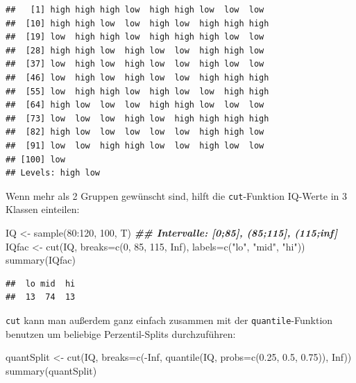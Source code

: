 \documentclass[
]{book}
\newenvironment{Shaded}{\begin{snugshade}}{\end{snugshade}}
\newcommand{\AttributeTok}[1]{\textcolor[rgb]{0.77,0.63,0.00}{#1}}
\newcommand{\ConstantTok}[1]{\textcolor[rgb]{0.00,0.00,0.00}{#1}}
\newcommand{\DecValTok}[1]{\textcolor[rgb]{0.00,0.00,0.81}{#1}}
\newcommand{\DocumentationTok}[1]{\textcolor[rgb]{0.56,0.35,0.01}{\textbf{\textit{#1}}}}
\newcommand{\FloatTok}[1]{\textcolor[rgb]{0.00,0.00,0.81}{#1}}
\newcommand{\FunctionTok}[1]{\textcolor[rgb]{0.00,0.00,0.00}{#1}}
\newcommand{\NormalTok}[1]{#1}
\newcommand{\OtherTok}[1]{\textcolor[rgb]{0.56,0.35,0.01}{#1}}
\newcommand{\SpecialCharTok}[1]{\textcolor[rgb]{0.00,0.00,0.00}{#1}}
\newcommand{\StringTok}[1]{\textcolor[rgb]{0.31,0.60,0.02}{#1}}
\begin{document}
\begin{verbatim}
##   [1] high high high low  high high low  low  low 
##  [10] high high low  low  high low  high high high
##  [19] low  high high low  high high high low  low 
##  [28] high high low  high low  low  high high low 
##  [37] low  high low  high low  low  high low  low 
##  [46] low  high low  high low  low  high high high
##  [55] low  high high low  high low  low  high high
##  [64] high low  low  low  high high low  low  low 
##  [73] low  low  low  high low  high high high high
##  [82] high low  low  low  low  low  high high low 
##  [91] low  low  high high low  low  high low  low 
## [100] low 
## Levels: high low
\end{verbatim}

Wenn mehr als 2 Gruppen gewünscht sind, hilft die \texttt{cut}-Funktion
IQ-Werte in 3 Klassen einteilen:

\begin{Shaded}
\begin{Highlighting}[]
\NormalTok{IQ }\OtherTok{\textless{}{-}} \FunctionTok{sample}\NormalTok{(}\DecValTok{80}\SpecialCharTok{:}\DecValTok{120}\NormalTok{, }\DecValTok{100}\NormalTok{, T)}
\DocumentationTok{\#\# Intervalle: [0;85], (85;115], (115;inf]}
\NormalTok{IQfac }\OtherTok{\textless{}{-}} \FunctionTok{cut}\NormalTok{(IQ, }\AttributeTok{breaks=}\FunctionTok{c}\NormalTok{(}\DecValTok{0}\NormalTok{, }\DecValTok{85}\NormalTok{, }\DecValTok{115}\NormalTok{, }\ConstantTok{Inf}\NormalTok{), }
             \AttributeTok{labels=}\FunctionTok{c}\NormalTok{(}\StringTok{"lo"}\NormalTok{, }\StringTok{"mid"}\NormalTok{, }\StringTok{"hi"}\NormalTok{))}
\FunctionTok{summary}\NormalTok{(IQfac)}
\end{Highlighting}
\end{Shaded}

\begin{verbatim}
##  lo mid  hi 
##  13  74  13
\end{verbatim}

\texttt{cut} kann man außerdem ganz einfach zusammen mit der \texttt{quantile}-Funktion benutzen um beliebige Perzentil-Splits durchzuführen:

\begin{Shaded}
\begin{Highlighting}[]
\NormalTok{quantSplit }\OtherTok{\textless{}{-}} \FunctionTok{cut}\NormalTok{(IQ,}
                  \AttributeTok{breaks=}\FunctionTok{c}\NormalTok{(}\SpecialCharTok{{-}}\ConstantTok{Inf}\NormalTok{, }
                           \FunctionTok{quantile}\NormalTok{(IQ, }
                                    \AttributeTok{probs=}\FunctionTok{c}\NormalTok{(}\FloatTok{0.25}\NormalTok{,}
                                            \FloatTok{0.5}\NormalTok{, }
                                            \FloatTok{0.75}\NormalTok{)), }
                           \ConstantTok{Inf}\NormalTok{))}
\FunctionTok{summary}\NormalTok{(quantSplit)}
\end{Highlighting}
\end{Shaded}
\end{document}
